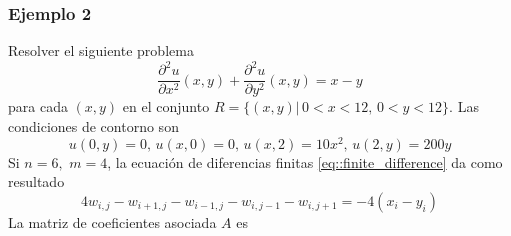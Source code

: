 \documentclass[a4paper]{article}
\begin{document}
\subsubsection{Ejemplo 2}
Resolver el siguiente problema 
\begin{equation}
\frac{\partial^2 u}{\partial x^2}(x,y)+\frac{\partial^2 u}{\partial y^2}(x,y)=x-y
\end{equation}
para cada $(x,y)$ en el conjunto $R=\{ (x,y)|\, 0<x<12,\, 0<y<12 \}$. Las condiciones de contorno  son 
\begin{equation*}
u(0,y)=0,\,u(x,0)=0,\, u(x,2)=10x^2,\, u(2,y)=200y
\end{equation*}
Si $n=6,\,\,m=4$, la ecuación de diferencias finitas \ref{eq::finite_difference} da como resultado
\begin{equation}
4w_{i,j}-w_{i+1,j}-w_{i-1,j}-w_{i,j-1}-w_{i,j+1}=-4(x_i-y_i)
\end{equation}
La matriz de coeficientes asociada $A$ es 
\end{document}
